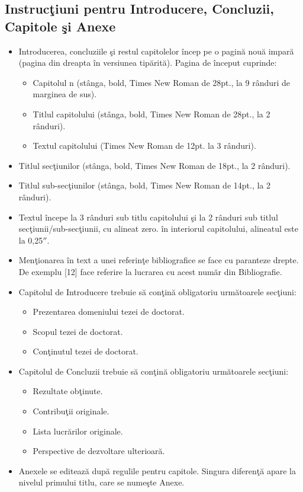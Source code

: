 \subsection*{Instruc\c{t}iuni pentru Introducere, Concluzii, Capitole \c{s}i Anexe}
\begin{itemize}
  \item Introducerea, concluziile \c{s}i restul capitolelor \^{i}ncep pe o pagin\u{a} nou\u{a} impar\u{a} (pagina din dreapta \^{i}n versiunea tip\u{a}rit\u{a}). Pagina de \^{i}nceput cuprinde:
\begin{itemize}
  \item Capitolul n (st\^{a}nga, bold, Times New Roman de 28pt., la 9 r\^{a}nduri de marginea de sus).
  \item Titlul capitolului (st\^{a}nga, bold, Times New Roman de 28pt., la 2 r\^{a}nduri).
  \item Textul capitolului (Times New Roman de 12pt. la 3 r\^{a}nduri).
  \end{itemize}
  \item Titlul sec\c{t}iunilor (st\^{a}nga, bold, Times New Roman de 18pt., la 2 r\^{a}nduri).
  \item Titlul sub-sec\c{t}iunilor (st\^{a}nga, bold, Times New Roman de 14pt., la 2 r\^{a}nduri).
  \item Textul \^{i}ncepe la 3 r\^{a}nduri sub titlu capitolului \c{s}i la 2 r\^{a}nduri sub titlul sec\c{t}iunii/sub-sec\c{t}iunii, cu alineat zero. \^{i}n interiorul capitolului, alineatul este la 0,25$''$.
  \item Men\c{t}ionarea \^{i}n text a unei referin\c{t}e bibliografice se face cu paranteze drepte. De exemplu [12] face referire la lucrarea cu acest num\u{a}r din Bibliografie.
  \item Capitolul de Introducere trebuie s\u{a} con\c{t}in\u{a} obligatoriu urm\u{a}toarele sec\c{t}iuni:
\begin{itemize}
  \item Prezentarea domeniului tezei de doctorat.
  \item Scopul tezei de doctorat.
  \item Con\c{t}inutul tezei de doctorat.
  \end{itemize}
  \item Capitolul de Concluzii trebuie s\u{a} con\c{t}in\u{a} obligatoriu urm\u{a}toarele sec\c{t}iuni:
\begin{itemize}
  \item Rezultate ob\c{t}inute.
  \item Contribu\c{t}ii originale.
  \item Lista lucr\u{a}rilor originale.
  \item Perspective de dezvoltare ulterioar\u{a}.
  \end{itemize}
  \item Anexele se editeaz\u{a} dup\u{a} regulile pentru capitole. Singura diferen\c{t}\u{a} apare la nivelul primului titlu, care se nume\c{s}te Anexe.
  \end{itemize}
  
